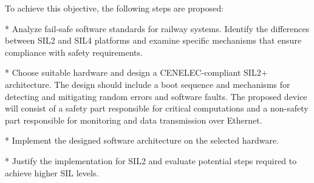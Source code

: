 To achieve this objective, the following steps are proposed:

\begitems  
* Analyze fail-safe software standards for railway systems. Identify the differences between SIL2 and SIL4 platforms and examine specific mechanisms that ensure compliance with safety requirements.

* Choose suitable hardware and design a CENELEC-compliant SIL2+ architecture. The design should include a boot sequence and mechanisms for detecting and mitigating random errors and software faults. The proposed device will consist of a safety part responsible for critical computations and a non-safety part responsible for monitoring and data transmission over Ethernet.

* Implement the designed software architecture on the selected hardware.

* Justify the implementation for SIL2 and evaluate potential steps required to achieve higher SIL levels.
\enditems